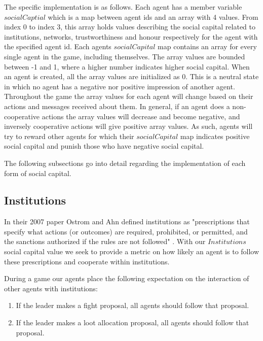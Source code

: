 The specific implementation is as follows. Each agent has a member variable $socialCaptial$ which is a map between agent ids and an array with 4 values. From index 0 to index 3, this array holds values describing the social capital related to institutions, networks, trustworthiness and honour respectively for the agent with the specified agent id. Each agents $socialCapital$ map contains an array for every single agent in the game, including themselves. The array values are bounded between -1 and 1, where a higher number indicates higher social capital. When an agent is created, all the array values are initialized as 0. This is a neutral state in which no agent has a negative nor positive impression of another agent. Throughout the game the array values for each agent will change based on their actions and messages received about them. In general, if an agent does a non-cooperative actions the array values will decrease and become negative, and inversely cooperative actions will give positive array values. As such, agents will try to reward other agents for which their $socialCapital$ map indicates positive social capital and punish those who have negative social capital.

The following subsections go into detail regarding the implementation of each form of social capital.

\subsection{Institutions}

In their 2007 paper Ostrom and Ahn defined institutions as "prescriptions that specify what actions (or outcomes) are required, prohibited, or permitted, and the sanctions authorized if the rules are not followed" \cite{ostrom-ahn}. With our $Institutions$ social capital value we seek to provide a metric on how likely an agent is to follow these prescriptions and cooperate within institutions. 

During a game our agents place the following expectation on the interaction of other agents with institutions:

\begin{enumerate}
    \item If the leader makes a fight proposal, all agents should follow that proposal.
    \item If the leader makes a loot allocation proposal, all agents should follow that proposal.
\end{enumerate}


